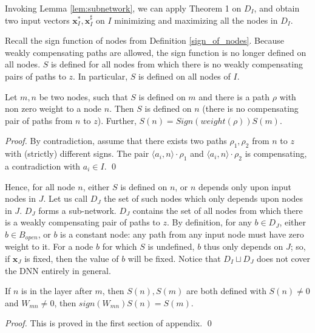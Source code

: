 			
			Invoking Lemma \ref{lem:subnetwork}, we can apply Theorem 1 on $D_I$, and obtain two input vectors $\boldsymbol{x}_I^*,\boldsymbol{x}_I^{\sharp}$ on $I$
			minimizing and maximizing all the nodes in $D_I$.

			\smallskip

		
			Recall the sign function of nodes from Definition \ref{sign_of_nodes}. 
			Because weakly compensating paths are allowed, the sign function is no longer defined on all nodes. $S$ is defined for all nodes from which there is no weakly compensating pairs of paths to $z$. In particular, $S$ is defined on all nodes of $I$.

			\begin{lemma}\label{lem:sign}
				Let $m,n$ be two nodes, such that $S$ is defined on $m$ and there is a path $\rho$ with non zero weight to a node $n$. Then $S$ is defined on $n$
				 (there is no compensating pair of paths from $n$ to $z$).
				Further, $S(n)= Sign(weight(\rho)) S(m)$.
			\end{lemma}
			
			\begin{proof}
				By contradiction, assume that there exists two paths $\rho_1,\rho_2$ from 
				$n$ to $z$ with (strictly) different signs. The pair $\langle a_i,n\rangle \cdot \rho_1$ and $\langle a_i,n\rangle \cdot \rho_2$ is compensating, a contradiction with $a_i\in I$. \qed
			\end{proof}

			Hence, for all node $n$, either $S$ is defined on $n$, or 
			$n$ depends only upon input nodes in $J$.
			Let us call $D_J$ the set of such nodes which only depends upon nodes in $J$.
			$D_J$ forms a sub-network.
			$D_J$ contains the set of all nodes from which there is a weakly compensating pair of paths to $z$.
			By definition, for any $b\in D_J$, either $b\in B_{open}$, or $b$ is a constant node: any path from any input node must have zero weight to it.
			For a node $b$ for which $S$ is undefined, $b$ thus only depends on $J$; so, if $\boldsymbol{x}_J$ is fixed, then the value of $b$ will be fixed.
			Notice that $D_I \sqcup D_J$ does not cover the DNN entirely in general.
			
			
			\iffalse
			\begin{lemma}
				If $n$ is in the layer after $m$, then $S(n), S(m)$ are both defined
				with $S(n) \neq 0$ and $W_{mn}\neq 0$, then $sign(W_{mn})S(n)=S(m)$.
			\end{lemma}
			
			\begin{proof}
				This is proved in the first section of appendix. \qed
			\end{proof}

